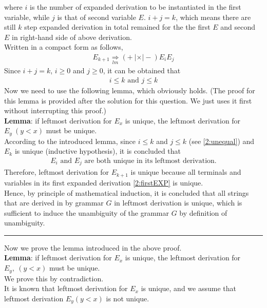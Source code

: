 \documentclass[11pt,a4paper]{article}
\newcommand{\htab}{\hspace*{0.63cm}}
\newcommand{\pg}{\\[0.3cm]}
\newcommand{\lmd}{\underset{lm}{\Longrightarrow}}
\begin{document}
\htab where $i$ is the number of expanded derivation to be instantiated in the first variable, 
while $j$ is that of second variable $E$. $i+j=k$, which means there are 
still $k$ step expanded derivation in total remained for the 
the first $E$ and second $E$ in right-hand side of above derivation. \\
\htab Written in a compact form as follows, 
\begin{align}
    E_{k+1} \lmd (+\ | \times | -) E_{i} E_{j} \label{2:firstEXP}
    \end{align}
\htab Since $i+j=k$, $i \geq 0$ and $j \geq 0$, it can be obtained that
\begin{align} \label{2:unequal}
    \text{$i \leq k$ and $j \leq k$}
    \end{align}
\htab Now we need to use the following lemma, which obviously holds. 
(The proof for this lemma is provided after the solution for this question.
We just uses it first without interrupting this proof.) \\
\htab \textbf{Lemma}: if leftmost derivation for $E_{x}$ is unique,
the leftmost derivation for $E_{y}\ (y < x)$ must be unique. \\ 
\htab According to the introduced lemma, since $i \leq k$ and $j \leq k$ (see \eqref{2:unequal})
 and $E_{k}$ is unique (inductive hypothesis), it is concluded that 
\begin{align}
    \text{$E_{i}$ and $E_{j}$ are both unique in its leftmost derivation.}
    \end{align}
\htab Therefore, leftmost derivation for $E_{k+1}$ is unique because 
all terminals and variables in its first expanded derivation \eqref{2:firstEXP} is unique. \\
\htab Hence, by principle of mathematical induction, it is concluded that all strings 
that are derived in by grammar $G$ in leftmost derivation is unique, which is sufficient to 
induce the unambiguity of the grammar $G$ by definition of unambiguity.\pg
\hrule \vspace*{0.2cm}
Now we prove the lemma introduced in the above proof. \\
\htab \textbf{Lemma}: if leftmost derivation for $E_{x}$ is unique,
the leftmost derivation for $E_{y},\ (y < x)$ must be unique. \\
\htab We prove this by contradiction. \\
\htab It is known that leftmost derivation for $E_{x}$ is unique, and we assume that 
leftmost derivation $E_{y}(y < x)$ is not unique. \\
\end{document}

